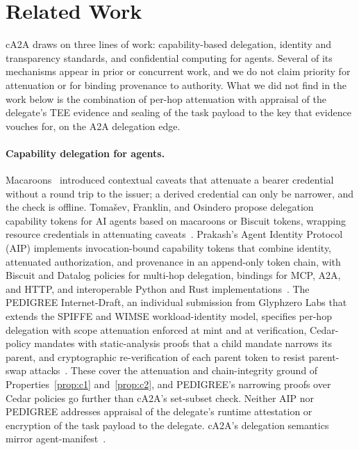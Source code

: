 \section{Related Work}\label{sec:related}

cA2A draws on three lines of work: capability-based delegation, identity and transparency
standards, and confidential computing for agents. Several of its mechanisms appear in prior or
concurrent work, and we do not claim priority for attenuation or for binding provenance to
authority. What we did not find in the work below is the combination of per-hop attenuation with
appraisal of the delegate's TEE evidence and sealing of the task payload to the key that
evidence vouches for, on the A2A delegation edge.

\paragraph{Capability delegation for agents.}
Macaroons~\citep{macaroons2014} introduced contextual caveats that attenuate a bearer credential
without a round trip to the issuer; a derived credential can only be narrower, and the check is
offline. Toma\v{s}ev, Franklin, and Osindero propose delegation capability tokens for AI agents based
on macaroons or Biscuit tokens, wrapping resource credentials in attenuating
caveats~\citep{tomasev2026}. Prakash's Agent Identity Protocol (AIP) implements invocation-bound
capability tokens that combine identity, attenuated authorization, and provenance in an
append-only token chain, with Biscuit and Datalog policies for multi-hop delegation, bindings for
MCP, A2A, and HTTP, and interoperable Python and Rust implementations~\citep{aip2026}. The PEDIGREE
Internet-Draft, an individual submission from Glyphzero Labs that extends the SPIFFE and WIMSE
workload-identity model, specifies per-hop delegation with scope attenuation enforced at mint and
at verification, Cedar-policy mandates with static-analysis proofs that a child mandate narrows
its parent, and cryptographic re-verification of each parent token to resist parent-swap
attacks~\citep{pedigree2026}. These cover the attenuation and chain-integrity ground of
Properties~\ref{prop:c1} and~\ref{prop:c2}, and PEDIGREE's narrowing proofs over Cedar policies go
further than cA2A's set-subset check. Neither AIP nor PEDIGREE addresses appraisal of the
delegate's runtime attestation or encryption of the task payload to the delegate. cA2A's
delegation semantics mirror agent-manifest~\citep{agentmanifest2026}.

